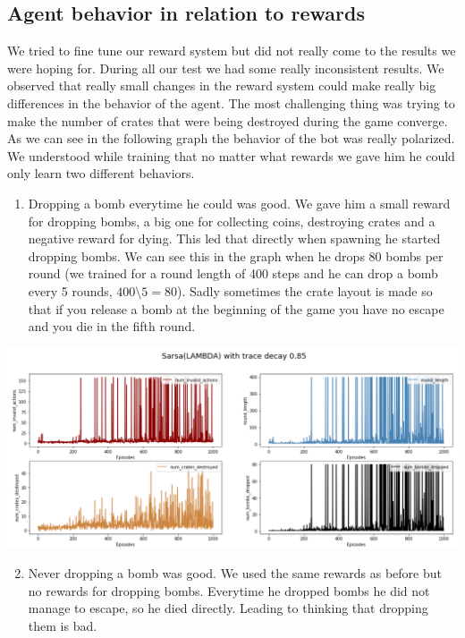 \subsection{Agent behavior in relation to rewards}
We tried to fine tune our reward system but did not really come to the results we were hoping for. During all our test we had some really inconsistent results. We observed that really small changes in the reward system could make really big differences in the behavior of the agent. The most challenging thing was trying to make the number of crates that were being destroyed during the game converge. As we can see in the following graph the behavior of the bot was really polarized. We understood while training that no matter what rewards we gave him he could only learn two different behaviors.
\begin{enumerate}
\item Dropping a bomb everytime he could was good. We gave him a small reward for dropping bombs, a big one for collecting coins, destroying crates and a negative reward for dying. This led that directly when spawning he started dropping bombs. We can see this in the graph when he drops 80 bombs per round (we trained for a round length of 400 steps and he can drop a bomb every 5 rounds, $400 \setminus5 = 80$). Sadly sometimes the crate layout is made so that if you release a bomb at the beginning of the game you have no escape and you die in the fifth round.
\end{enumerate}
\begin{center}
\includegraphics[scale=0.22]{graphics/plot05.png}
\end{center}
\begin{enumerate}
\setcounter{enumi}{1}
\item Never dropping a bomb was good. We used the same rewards as before but no rewards for dropping bombs. Everytime he dropped bombs he did not manage to escape, so he died directly. Leading to thinking that dropping them is bad.
\end{enumerate}
